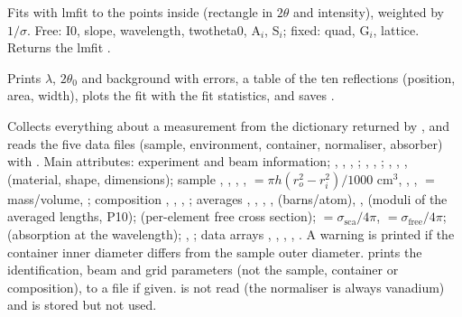 \documentclass[11pt,a4paper]{article}
\begin{document}
 
Fits  with lmfit to the points inside 
(rectangle in $2\theta$ and intensity), weighted by $1/\sigma$. Free: I0,
slope, wavelength, twotheta0, A$_i$, S$_i$; fixed: quad, G$_i$, lattice.
Returns the lmfit .

Prints $\lambda$, $2\theta_0$ and background with errors, a table of the
ten reflections (position, area, width), plots the fit with the fit
statistics, and saves .



 
Collects everything about a measurement from the dictionary returned by
, and reads the five data files (sample, environment,
container, normaliser, absorber) with . Main attributes:
experiment and beam information; , ,
, ; , ,
; , , ,
 (material, shape, dimensions); sample ,
, , , 
$=\pi h(r_o^2-r_i^2)/1000$ cm$^3$, , ,
 $=$ mass/volume, ; composition
, , , ; averages
, , , , 
(barns/atom), ,  (moduli of the averaged lengths,
P10);  (per-element free cross section); 
$=\sigma_\mathrm{sca}/4\pi$,  $=\sigma_\mathrm{free}/4\pi$;
 (absorption at the wavelength); ,
; data arrays , ,
, , . A warning is printed if
the container inner diameter differs from the sample outer diameter.
 prints the identification, beam and grid
parameters (not the sample, container or composition), to a file if given.
 is not read (the normaliser is always vanadium) and
 is stored but not used.
\end{document}
